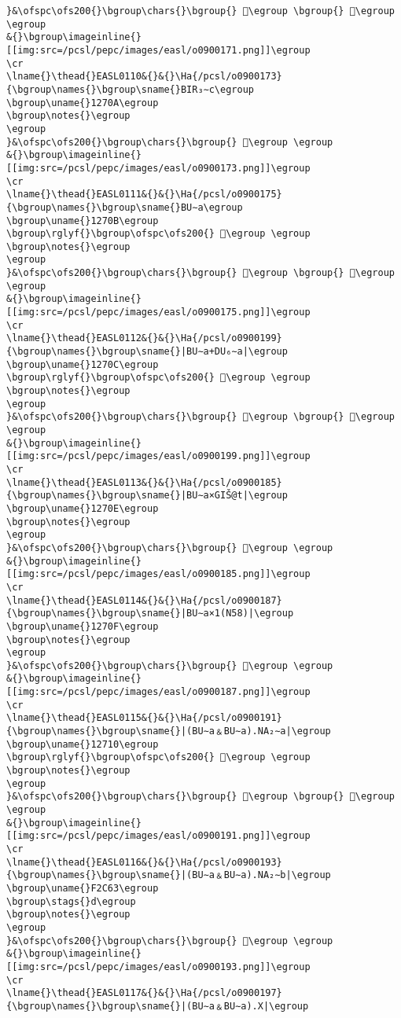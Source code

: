 \begin{verbatim}
}&\ofspc\ofs200{}\bgroup\chars{}\bgroup{} 𒜉\egroup \bgroup{} 𒜈\egroup \egroup
&{}\bgroup\imageinline{}[[img:src=/pcsl/pepc/images/easl/o0900171.png]]\egroup
\cr
\lname{}\thead{}EASL0110&{}&{}\Ha{/pcsl/o0900173}{\bgroup\names{}\bgroup\sname{}BIR₃∼c\egroup
\bgroup\uname{}1270A\egroup
\bgroup\notes{}\egroup
\egroup
}&\ofspc\ofs200{}\bgroup\chars{}\bgroup{} 𒜊\egroup \egroup
&{}\bgroup\imageinline{}[[img:src=/pcsl/pepc/images/easl/o0900173.png]]\egroup
\cr
\lname{}\thead{}EASL0111&{}&{}\Ha{/pcsl/o0900175}{\bgroup\names{}\bgroup\sname{}BU∼a\egroup
\bgroup\uname{}1270B\egroup
\bgroup\rglyf{}\bgroup\ofspc\ofs200{} 𒜋\egroup \egroup
\bgroup\notes{}\egroup
\egroup
}&\ofspc\ofs200{}\bgroup\chars{}\bgroup{} 𒜓\egroup \bgroup{} 𒜋\egroup \egroup
&{}\bgroup\imageinline{}[[img:src=/pcsl/pepc/images/easl/o0900175.png]]\egroup
\cr
\lname{}\thead{}EASL0112&{}&{}\Ha{/pcsl/o0900199}{\bgroup\names{}\bgroup\sname{}|BU∼a+DU₆∼a|\egroup
\bgroup\uname{}1270C\egroup
\bgroup\rglyf{}\bgroup\ofspc\ofs200{} 𒜌\egroup \egroup
\bgroup\notes{}\egroup
\egroup
}&\ofspc\ofs200{}\bgroup\chars{}\bgroup{} 𒜌\egroup \bgroup{} 𒜍\egroup \egroup
&{}\bgroup\imageinline{}[[img:src=/pcsl/pepc/images/easl/o0900199.png]]\egroup
\cr
\lname{}\thead{}EASL0113&{}&{}\Ha{/pcsl/o0900185}{\bgroup\names{}\bgroup\sname{}|BU∼a×GIŠ@t|\egroup
\bgroup\uname{}1270E\egroup
\bgroup\notes{}\egroup
\egroup
}&\ofspc\ofs200{}\bgroup\chars{}\bgroup{} 𒜎\egroup \egroup
&{}\bgroup\imageinline{}[[img:src=/pcsl/pepc/images/easl/o0900185.png]]\egroup
\cr
\lname{}\thead{}EASL0114&{}&{}\Ha{/pcsl/o0900187}{\bgroup\names{}\bgroup\sname{}|BU∼a×1(N58)|\egroup
\bgroup\uname{}1270F\egroup
\bgroup\notes{}\egroup
\egroup
}&\ofspc\ofs200{}\bgroup\chars{}\bgroup{} 𒜏\egroup \egroup
&{}\bgroup\imageinline{}[[img:src=/pcsl/pepc/images/easl/o0900187.png]]\egroup
\cr
\lname{}\thead{}EASL0115&{}&{}\Ha{/pcsl/o0900191}{\bgroup\names{}\bgroup\sname{}|(BU∼a﹠BU∼a).NA₂∼a|\egroup
\bgroup\uname{}12710\egroup
\bgroup\rglyf{}\bgroup\ofspc\ofs200{} 𒜐\egroup \egroup
\bgroup\notes{}\egroup
\egroup
}&\ofspc\ofs200{}\bgroup\chars{}\bgroup{} 𒜐\egroup \bgroup{} 𒜑\egroup \egroup
&{}\bgroup\imageinline{}[[img:src=/pcsl/pepc/images/easl/o0900191.png]]\egroup
\cr
\lname{}\thead{}EASL0116&{}&{}\Ha{/pcsl/o0900193}{\bgroup\names{}\bgroup\sname{}|(BU∼a﹠BU∼a).NA₂∼b|\egroup
\bgroup\uname{}F2C63\egroup
\bgroup\stags{}d\egroup
\bgroup\notes{}\egroup
\egroup
}&\ofspc\ofs200{}\bgroup\chars{}\bgroup{} 󲱣\egroup \egroup
&{}\bgroup\imageinline{}[[img:src=/pcsl/pepc/images/easl/o0900193.png]]\egroup
\cr
\lname{}\thead{}EASL0117&{}&{}\Ha{/pcsl/o0900197}{\bgroup\names{}\bgroup\sname{}|(BU∼a﹠BU∼a).X|\egroup

\end{verbatim}
